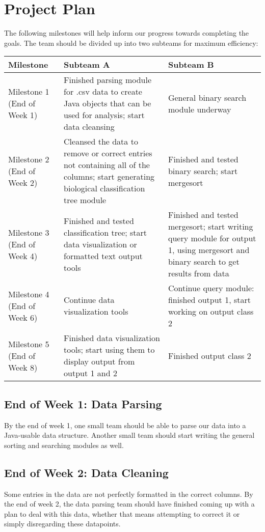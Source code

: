 \documentclass{article}
\begin{document}
\section{Project Plan}
The following milestones will help inform our progress towards completing the goals. The team should be divided up into two subteams for maximum efficiency:

\begin{table}[h]
	\centering
	\begin{tabular}{p{0.16\hsize}p{0.38\hsize}p{0.38\hsize}}
		\toprule
		\textbf{Milestone} & \textbf{Subteam A} & \textbf{Subteam B}\\
		\midrule
		Milestone 1 \newline(End of Week 1)
		& Finished parsing module for .csv data to create Java objects that can be used for analysis; start data cleansing
		& General binary search module underway \\
		\midrule
		Milestone 2 \newline(End of Week 2)
		& Cleansed the data to remove or correct entries not containing all of the columns; start generating biological classification tree module
		& Finished and tested binary search; start mergesort \\
		\midrule
		Milestone 3 \newline(End of Week 4)
		& Finished and tested classification tree; start data visualization or formatted text output tools
		& Finished and tested mergesort; start writing query module for output 1, using mergesort and binary search to get results from data \\
		\midrule
		Milestone 4 \newline(End of Week 6)
		& Continue data visualization tools
		& Continue query module: finished output 1, start working on output class 2 \\
		\midrule
		Milestone 5 \newline(End of Week 8)
		& Finished data visualization tools; start using them to display output from output 1 and 2
		& Finished output class 2 \\
		\bottomrule
	\end{tabular}
\end{table}

\subsection{End of Week 1: Data Parsing}
By the end of week 1, one small team should be able to parse our data into a Java-usable data structure. Another small team should start writing the general sorting and searching modules as well.
\subsection{End of Week 2: Data Cleaning}
Some entries in the data are not perfectly formatted in the correct columns. By the end of week 2, the data parsing team should have finished coming up with a plan to deal with this data, whether that means attempting to correct it or simply disregarding these datapoints.






\end{document}
